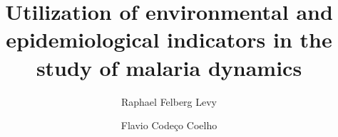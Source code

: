 \documentclass[3p,times]{elsarticle}
\begin{document}
\begin{frontmatter}



\dochead{}

\title{Utilization of environmental and epidemiological indicators in the study of malaria dynamics}


\author{Raphael Felberg Levy}

\author{Flavio Codeço Coelho}


\address{Praia de Botafogo 190, Rio de Janeiro, Brazil}


\end{frontmatter}
\end{document}
